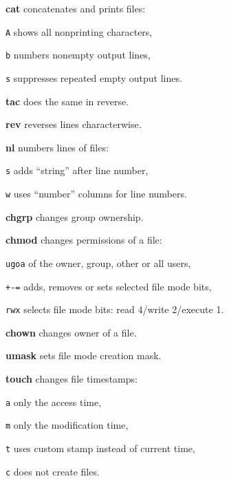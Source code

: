 \begin{compactenum}
	\item [\cmdcore] \textbf{cat} concatenates and prints files:
	\item [\texttt{A}] shows all nonprinting characters,
	\item [\texttt{b}] numbers nonempty output lines,
	\item [\texttt{s}] suppresses repeated empty output lines.
	\item [\cmdcore] \textbf{tac} does the same in reverse.
	\item [\cmdvar] \textbf{rev} reverses lines characterwise.
	\item [\cmdcore] \textbf{nl} numbers lines of files:
	\item [\texttt{s}] adds ``string'' after line number,
	\item [\texttt{w}] uses ``number'' columns for line numbers.
\end{compactenum}

\begin{compactenum}
	\item [\cmdcore] \textbf{chgrp} changes group ownership.
	
	\item [\cmdcore] \textbf{chmod} changes permissions of a file:
	\item [\texttt{ugoa}] of the owner, group, other or all users,
	\item [\texttt{+-=}] adds, removes or sets selected file mode bits,
	\item [\texttt{rwx}] selects file mode bits: read 4/write 2/execute 1.
	
	\item [\cmdcore] \textbf{chown} changes owner of a file.
	
	\item [\cmdvar] \textbf{umask} sets file mode creation mask.

	\item [\cmdcore] \textbf{touch} changes file timestamps:
	\item [\texttt{a}] only the access time,
	\item [\texttt{m}] only the modification time,
	\item [\texttt{t}] uses custom stamp instead of current time,
	\item [\texttt{c}] does not create files.
\end{compactenum}

